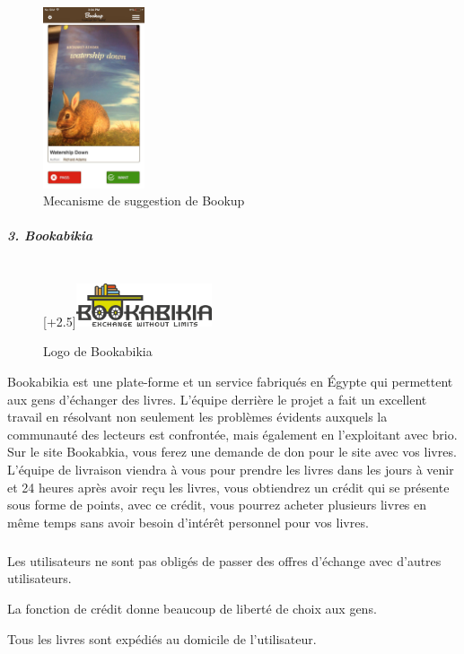 \begin{figure}[h]
	\begin{center}
		\includegraphics[width=3cm]{Images/chapter1/bookUpScreenshot.jpg}
		\caption{Mecanisme de suggestion de Bookup}
	\end{center}
\end{figure}
\newpage

\subparagraph{{\large 3. Bookabikia\\\\}}

\begin{figure}
	\raisebox{0pt}[\dimexpr\height+2.5\baselineskip\relax]{\includegraphics[width=4cm]{Images/chapter1/bookabikiaLogo.png}}
	\caption{Logo de Bookabikia}
\end{figure}

Bookabikia est une plate-forme et un service fabriqués en Égypte qui permettent aux gens d'échanger des livres. L'équipe derrière le projet a fait un excellent travail en résolvant non seulement les problèmes évidents auxquels la communauté des lecteurs est confrontée, mais également en l'exploitant avec brio. Sur le site Bookabkia, vous ferez une demande de don pour le site avec vos livres. L’équipe de livraison viendra à vous pour prendre les livres dans les jours à venir et 24 heures après avoir reçu les livres, vous obtiendrez un crédit qui se présente sous forme de points, avec ce crédit, vous pourrez acheter plusieurs livres en même temps sans avoir besoin d’intérêt personnel pour vos livres.

\subparagraph*{}
\begin{list}{•}{\textbf{Avantages}}
	\item Les utilisateurs ne sont pas obligés de passer des offres d'échange avec d'autres utilisateurs.
	\item La fonction de crédit donne beaucoup de liberté de choix aux gens.
	\item Tous les livres sont expédiés au domicile de l'utilisateur.
\end{list}

